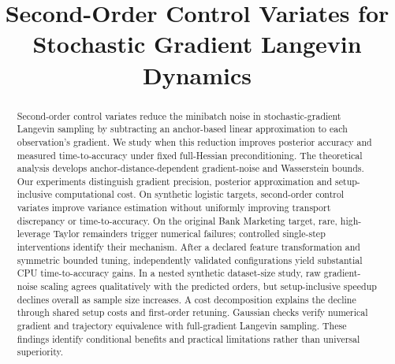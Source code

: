 \documentclass[ba]{imsart}
\theoremstyle{plain}
\theoremstyle{definition}
\begin{document}
\begin{frontmatter}
\title{Second-Order Control Variates for Stochastic Gradient Langevin Dynamics}
\begin{abstract}
Second-order control variates reduce the minibatch noise in stochastic-gradient Langevin sampling by subtracting an anchor-based linear approximation to each observation's gradient. We study when this reduction improves posterior accuracy and measured time-to-accuracy under fixed full-Hessian preconditioning. The theoretical analysis develops anchor-distance-dependent gradient-noise and Wasserstein bounds. Our experiments distinguish gradient precision, posterior approximation and setup-inclusive computational cost. On synthetic logistic targets, second-order control variates improve variance estimation without uniformly improving transport discrepancy or time-to-accuracy. On the original Bank Marketing target, rare, high-leverage Taylor remainders trigger numerical failures; controlled single-step interventions identify their mechanism. After a declared feature transformation and symmetric bounded tuning, independently validated configurations yield substantial CPU time-to-accuracy gains. In a nested synthetic dataset-size study, raw gradient-noise scaling agrees qualitatively with the predicted orders, but setup-inclusive speedup declines overall as sample size increases. A cost decomposition explains the decline through shared setup costs and first-order retuning. Gaussian checks verify numerical gradient and trajectory equivalence with full-gradient Langevin sampling. These findings identify conditional benefits and practical limitations rather than universal superiority.
\end{abstract}
\begin{keyword}
\end{keyword}
\end{frontmatter}




\end{document}
